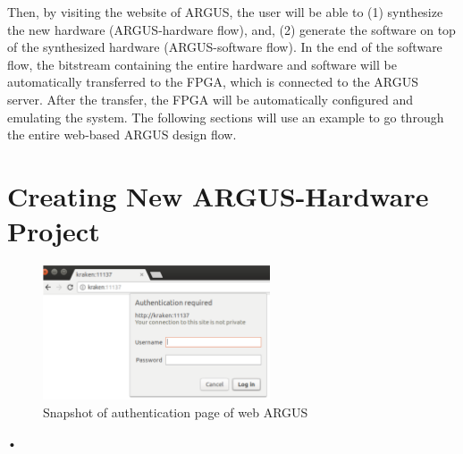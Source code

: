 \documentclass[a4paper,10pt]{article}
\begin{document}
Then, by visiting the website of ARGUS, the user will be able to (1) synthesize the new hardware (ARGUS-hardware flow), and, (2) generate the software on top of the synthesized hardware (ARGUS-software flow). In the end of the software flow, the bitstream containing the entire hardware and software will be automatically transferred to the FPGA, which is connected to the ARGUS server. After the transfer, the FPGA will be automatically configured and emulating the system. The following sections will use an example to go through the entire web-based ARGUS design flow.

\newpage

\section{Creating New ARGUS-Hardware Project}
\begin{figure}[tb]
\centering
\includegraphics[width=0.6\textwidth]{fig/login.eps}
\caption{Snapshot of authentication page of web ARGUS}\label{fig-login}
\end{figure}•
\end{document}
